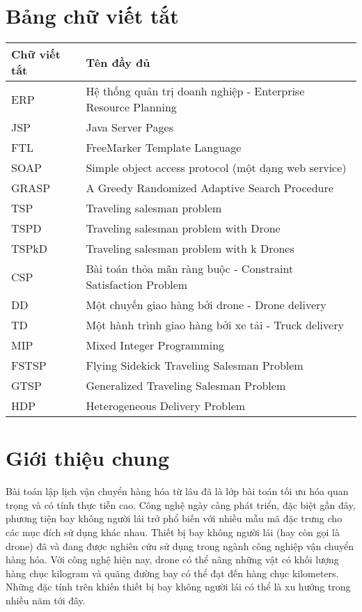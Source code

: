 \documentclass[a4paper,12pt]{report}
\begin{document}
\chapter*{Bảng chữ viết tắt}
\begin{longtable}{|l|l|}
\toprule
Chữ viết tắt & Tên đầy đủ\\
\midrule
        \toprule
ERP &  Hệ thống quản trị doanh nghiệp - Enterprise Resource Planning \\ \hline
JSP &  Java Server Pages \\ \hline
FTL & FreeMarker Template Language \\ \hline
SOAP & Simple object access protocol (một dạng web service) \\ \hline
GRASP & A Greedy Randomized Adaptive Search Procedure \\ \hline
TSP & Traveling salesman problem \\ \hline
TSPD & Traveling salesman problem with Drone \\ \hline
TSPkD & Traveling salesman problem with k Drones \\ \hline
CSP & Bài toán thỏa mãn ràng buộc - Constraint Satisfaction Problem \\ \hline
DD & Một chuyến giao hàng bởi drone - Drone delivery  \\ \hline
TD & Một hành trình giao hàng bởi xe tải - Truck delivery \\ \hline
MIP &  Mixed Integer Programming \\ \hline
FSTSP & Flying Sidekick Traveling Salesman Problem \\ \hline
GTSP & Generalized Traveling Salesman Problem \\ \hline
HDP & Heterogeneous Delivery Problem \\ \hline
\end{longtable}
\listoftables
\listoffigures


{}
\chapter*{Giới thiệu chung}
Bài toán lập lịch vận chuyển hàng hóa từ lâu đã là lớp bài toán tối ưu hóa quan trọng và có tính thực tiễn cao. Công nghệ ngày càng phát triển, đặc biệt gần đây, phương tiện bay không người lái trở phổ biến với nhiều mẫu mã đặc trưng cho các mục đích sử dụng khác nhau. Thiết bị bay không người lái (hay còn gọi là drone) đã và đang được nghiên cứu sử dụng trong ngành công nghiệp vận chuyển hàng hóa. Với công nghệ hiện nay, drone có thể nâng những vật có khối lượng hàng chục kilogram và quãng đường bay có thể đạt đến hàng chục kilometers. Những đặc tính trên khiến thiết bị bay không người lái có thể là xu hướng trong nhiều năm tới đây.
\end{document}
